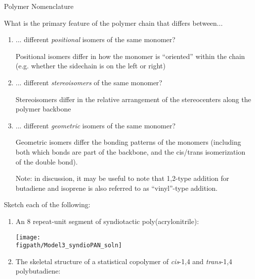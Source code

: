 \begin{activity}{Polymer Nomenclature}
\begin{ctqs}
	\question What is the primary feature of the polymer chain that differs between...
	
		\begin{enumerate}
			\item ... different \emph{positional} isomers of the same monomer?
			
				\begin{solution}[0.5in]{}
					Positional isomers differ in how the monomer is ``oriented'' within the chain (e.g. whether the sidechain is on the left or right)
				\end{solution}
			
			\item ... different \emph{stereoisomers} of the same monomer?
			
				\begin{solution}[0.5in]{}
					Stereoisomers differ in the relative arrangement of the stereocenters along the polymer backbone
				\end{solution}
			
			\item ... different \emph{geometric} isomers of the same monomer?
			
				\begin{solution}[0.5in]{}
					Geometric isomers differ the bonding patterns of the monomers (including both which bonds are part of the backbone, and the cis/trans isomerization of the double bond).
					
					Note: in discussion, it may be useful to note that 1,2-type addition for butadiene and isoprene is also referred to as ``vinyl''-type addition. 
				\end{solution}
			
		\end{enumerate}
		
	\question Sketch each of the following:
	
		\begin{enumerate}
			\item An 8 repeat-unit segment of syndiotactic poly(acrylonitrile):
			
				\begin{solution}[1in]{}
			\centerline{\texttt{[image: \\figpath/Model3\_syndioPAN\_soln]}}
		\end{solution}
			
			\item The skeletal structure of a statistical copolymer of \emph{cis}-1,4 and \emph{trans}-1,4 polybutadiene:
			

\end{enumerate}
\end{ctqs}
\end{activity}
